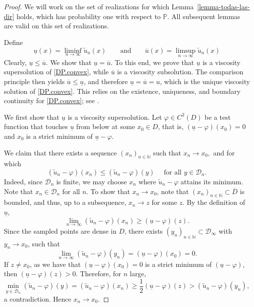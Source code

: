 \documentclass[11pt]{amsart}
\theoremstyle{definition}
\theoremstyle{remark}
\numberwithin{equation}{section}
\newcommand{\N}{{\mathbb N}}
\renewcommand{\P}{\mathbb{P}}
\newcommand{\Domain}{\mathcal{D}}
\begin{document}
\begin{proof}
	We will work on the set of realizations for which Lemma~\ref{lemma-todas-las-dir} holds, which has probability one with respect to $\P$. All subsequent lemmas are valid on this set of realizations.

	Define
	\[
	\underline{u}(x)=\liminf_{n\to \infty} \tilde{u}_n(x) \qquad \text{and} \qquad \overline{u}(x)=\limsup_{n\to \infty} \tilde{u}_n(x) 
	\]
	Clearly, $\underline{u}\le \overline{u}$. 
	We show that $\underline{u}=\overline{u}$. 
	To this end, we prove that $\underline{u}$ is a viscosity supersolution of \eqref{DP.convex}, while $\overline{u}$ is a viscosity subsolution. 
	The comparison principle then yields $\overline{u}\le\underline{u}$, and therefore $\underline{u}=\overline{u}=u$, which is the unique viscosity solution of \eqref{DP.convex}.
	This relies on the existence, uniqueness, and boundary continuity for \eqref{DP.convex}; see \cite{OS,Ober}.	
	
	We first show that $\underline{u}$ is a viscosity supersolution. Let $\varphi\in C^2(D)$ be a test function that touches $\underline{u}$ from below at some  $x_0\in D$, that is, $(\underline{u}-\varphi)(x_0)=0$ and $x_0$ is a strict minimum of $\underline{u}-\varphi$.
	
	We claim that there exists a sequence $(x_n)_{n\in \N}$ such that $x_n\to x_0,$ and for which
	\[
	(\tilde{u}_n -\varphi)(x_n)\le (\tilde{u}_n - \varphi)(y) \quad \text{ for all } y\in\Domain_n.
	\] 
	Indeed, since $\Domain_n$ is finite, we may choose $x_n$ where $\tilde{u}_n-\varphi$ attains its minimum. 
	Note that $x_n\in\Domain_n$ for all $n$.
	To show that $x_n\to x_0$, note that $(x_n)_{n\in\N} \subset \overline{D}$ is bounded, and thus, up to a subsequence, $x_n\to z$ for some $z$. By the definition of $\underline{u}$,
	 \[
	 \lim_{n\to \infty} (\tilde{u}_n-\varphi)(x_n) \geq (\underline{u}-\varphi) (z).
	 \]
Since the sampled points are dense in $D$, there exists $(y_n)_{n\in \N}\subset \Domain_{\infty}$ with $y_n\to x_0$, such that
	\[
	 \lim_{n\to \infty} (\tilde{u}_n -\varphi)(y_n) = (\underline{u}-\varphi) (x_0) =0.
	 \]
	 If $z\neq x_0$, as we have that $(\underline{u}-\varphi)(x_0)=0$ is a strict minimum of $(\underline{u}-\varphi)$, then $(\underline{u}-\varphi) (z) >0$.
	Therefore, for $n$ large,
	\[
	 \min_{y\in \Domain_n} (\tilde{u}_n-\varphi) (y) = (\tilde{u}_n-\varphi)(x_n) \geq \frac12 (\underline{u}-\varphi) (z) >
	 (\tilde{u}_n-\varphi)(y_n),
	 \]
	 a contradiction. 
	 Hence $x_n\to x_0$.
	

\end{proof}
\end{document}
